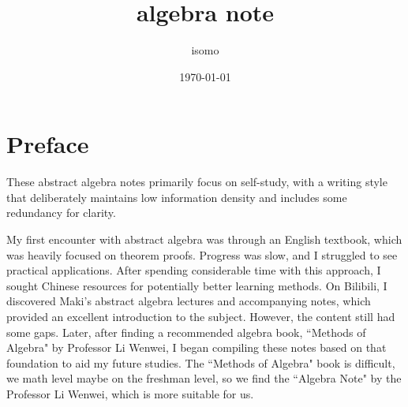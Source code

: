 \documentclass[11pt,lang=en]{elegantbook}
\title{algebra note}
\author{isomo}
\date{\today}
\begin{document}
\maketitle

\chapter*{Preface}

These abstract algebra notes primarily focus on self-study, with a writing style that deliberately maintains low information density and includes some redundancy for clarity.

My first encounter with abstract algebra was through an English textbook, which was heavily focused on theorem proofs. Progress was slow, and I struggled to see practical applications. After spending considerable time with this approach, I sought Chinese resources for potentially better learning methods. On Bilibili, I discovered Maki's abstract algebra lectures and accompanying notes, which provided an excellent introduction to the subject. However, the content still had some gaps. Later, after finding a recommended algebra book, ``Methods of Algebra" by Professor Li Wenwei, I began compiling these notes based on that foundation to aid my future studies. The ``Methods of Algebra" book is difficult, we math level maybe on the freshman level, so we find the ``Algebra Note" by the Professor Li Wenwei, which is more suitable for us.

\frontmatter
\tableofcontents

\mainmatter








\end{document}
